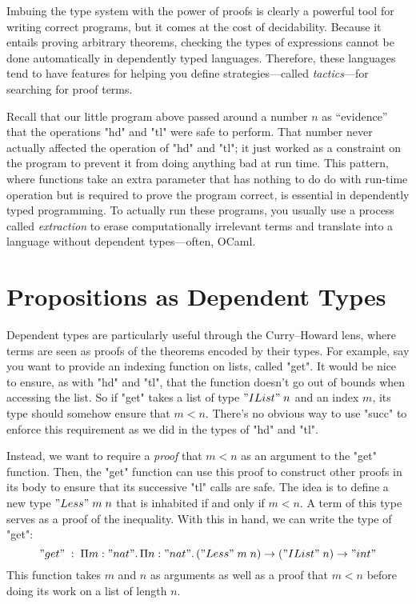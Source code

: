 Imbuing the type system with the power of proofs is clearly a powerful tool
for writing correct programs, but it comes at the cost of decidability.
Because it entails proving arbitrary theorems, checking the types of
expressions cannot be done automatically in dependently typed languages.
Therefore, these languages tend to have features for helping you define
strategies---called \emph{tactics}---for searching for proof terms.

Recall that our little program above passed around a number $n$ as
``evidence'' that the operations "hd" and "tl" were safe to perform.
That number never actually affected the operation of "hd" and "tl"; it just
worked as a constraint on the program to prevent it from doing anything bad at
run time.
This pattern, where functions take an extra parameter that has
nothing to do do with run-time operation but is required to prove the program
correct, is essential in dependently typed programming.
To actually run these programs, you usually use a process called
\emph{extraction} to erase computationally irrelevant terms and translate into
a language without dependent types---often, OCaml.


\section{Propositions as Dependent Types}

Dependent types are particularly useful through the Curry--Howard lens, where
terms are seen as proofs of the theorems encoded by their types.
For example, say you want to provide an indexing function on lists, called
"get".
It would be nice to ensure, as with "hd" and "tl", that the function doesn't
go out of bounds when accessing the list.
So if "get" takes a list of type $"IList" \; n$ and an index $m$, its type
should somehow ensure that $m < n$.
There's no obvious way to use "succ" to enforce this requirement as we did in
the types of "hd" and "tl".

Instead, we want to require a \emph{proof} that $m < n$ as an argument to the
"get" function.
Then, the "get" function can use this proof to construct other proofs in
its body to ensure that its successive "tl" calls are safe.
The idea is to define a new type $"Less" \; m \; n$ that is inhabited if and
only if $m < n$.
A term of this type serves as a proof of the inequality.
With this in hand, we can write the type of "get":
%
\[
"get" \;:\;
\Pi m : "nat". \,
\Pi n : "nat". \,
("Less" \; m \; n) \to
("IList" \; n) \to
"int"
\]
%
This function takes $m$ and $n$ as arguments as well as a proof that $m < n$
before doing its work on a list of length $n$.

